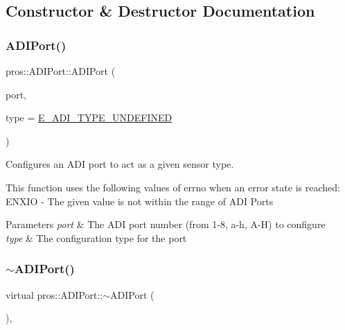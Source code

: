 \subsection{Constructor \& Destructor Documentation}
\mbox{\label{classpros_1_1ADIPort_ab6ef7710de366895859d770ffb1d8cf1}} 
\subsubsection{\texorpdfstring{A\+D\+I\+Port()}{ADIPort()}}
{\footnotesize\ttfamily pros\+::\+A\+D\+I\+Port\+::\+A\+D\+I\+Port (\begin{DoxyParamCaption}\item[{std\+::uint8\+\_\+t}]{port,  }\item[{\hyperlink{adi_8h_a4efff81399e823764aa05cd5c172ea55}{adi\+\_\+port\+\_\+config\+\_\+e\+\_\+t}}]{type = {\ttfamily \hyperlink{adi_8h_ad5f9ddf0fd9de73c4b23fa5485144b7fa37e9d6ebc03d88c58db1904a7f2b7373}{E\+\_\+\+A\+D\+I\+\_\+\+T\+Y\+P\+E\+\_\+\+U\+N\+D\+E\+F\+I\+N\+ED}} }\end{DoxyParamCaption})}



Configures an A\+DI port to act as a given sensor type. 

This function uses the following values of errno when an error state is reached\+: E\+N\+X\+IO -\/ The given value is not within the range of A\+DI Ports


\begin{DoxyParams}{Parameters}
{\em port} & The A\+DI port number (from 1-\/8, \textquotesingle{}a\textquotesingle{}-\/\textquotesingle{}h\textquotesingle{}, \textquotesingle{}A\textquotesingle{}-\/\textquotesingle{}H\textquotesingle{}) to configure \\
\hline
{\em type} & The configuration type for the port \\
\hline
\end{DoxyParams}
\mbox{\label{classpros_1_1ADIPort_ae6a3753c05e008992e6eff5e8c927e46}} 
\subsubsection{\texorpdfstring{$\sim$\+A\+D\+I\+Port()}{~ADIPort()}}
{\footnotesize\ttfamily virtual pros\+::\+A\+D\+I\+Port\+::$\sim$\+A\+D\+I\+Port (\begin{DoxyParamCaption}\item[{void}]{ }\end{DoxyParamCaption})\hspace{0.3cm}{\ttfamily [virtual]}, {\ttfamily [default]}}



